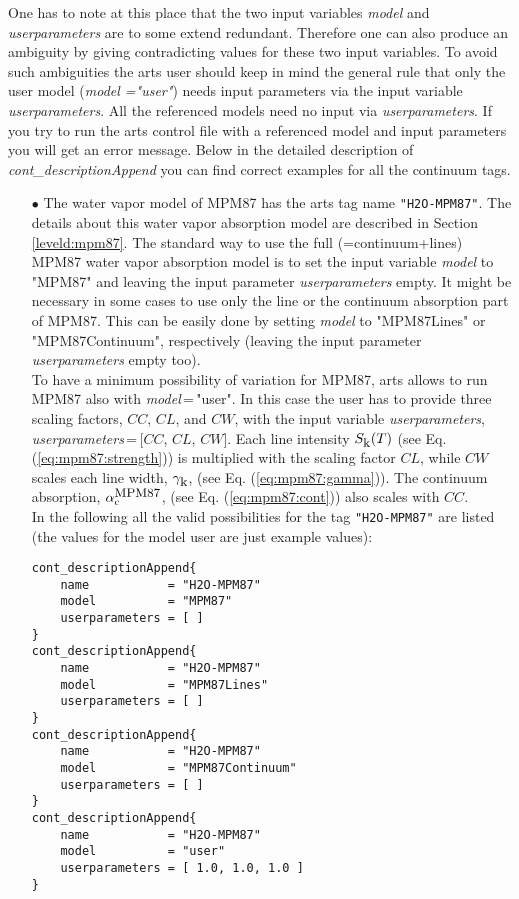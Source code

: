 One has to note at this place that the two input variables {\it model} and
{\it userparameters} are to some extend redundant. Therefore one can also 
produce an ambiguity by giving contradicting values for these two input variables.
To avoid such ambiguities the arts user should keep in mind the general 
rule that only the user model ({\it model ="user"}) needs input parameters 
via the input variable {\it userparameters}. All the referenced models 
need no input via {\it userparameters}. If you try to run the arts control 
file with a referenced model and input parameters you will get an error message.
Below in the detailed description of {\it cont\_descriptionAppend} you 
can find correct examples for all the continuum tags.

\begin{itemize}
\item[$\bullet$] The water vapor model of MPM87 \citep{liebeandlayton:87} 
     has the arts tag name {\tt "H2O-MPM87"}. The details about this water 
     vapor absorption model are described in Section \ref{leveld:mpm87}. 
     The standard way to use the full (=continuum+lines) MPM87 water 
     vapor absorption model is to set the input variable {\it model} 
     to "MPM87" and leaving the input parameter {\it userparameters} empty. 
     It might be necessary in some cases to use only the line or the 
     continuum absorption part of MPM87. This can be easily done 
     by setting {\it model} to "MPM87Lines" or "MPM87Continuum", 
     respectively (leaving the input parameter {\it userparameters} 
     empty too).\\ To have a minimum possibility of variation for MPM87, 
     arts allows to run MPM87 also with {\it model}\,=\,"user". 
     In this case the user has to provide three scaling factors,  
     $CC$, $CL$, and $CW$, with the input variable {\it userparameters}, 
     {\it userparameters}\,=\,$[$$CC$, $CL$, $CW$$]$. 
     Each line intensity $S_{\mbox{\rm \small k}}(T)$ (see Eq. (\ref{eq:mpm87:strength})) 
     is multiplied with the scaling factor $CL$, while $CW$ scales 
     each line width, $\gamma_{\mbox{\rm \small k}}$, (see Eq. (\ref{eq:mpm87:gamma})). 
     The continuum absorption, $\alpha^{\mbox{\rm \small MPM87}}_{\rm c}$, 
     (see Eq. (\ref{eq:mpm87:cont})) also scales with $CC$.\\
     In the following all the valid possibilities for the
     tag {\tt "H2O-MPM87"} are listed (the values for the 
     model user are just example values): 
\begin{lstlisting}
cont_descriptionAppend{
    name           = "H2O-MPM87"
    model          = "MPM87"
    userparameters = [ ]
}
cont_descriptionAppend{
    name           = "H2O-MPM87"
    model          = "MPM87Lines"
    userparameters = [ ]
}
cont_descriptionAppend{
    name           = "H2O-MPM87"
    model          = "MPM87Continuum"
    userparameters = [ ]
}
cont_descriptionAppend{
    name           = "H2O-MPM87"
    model          = "user"
    userparameters = [ 1.0, 1.0, 1.0 ]
}
\end{lstlisting}


\end{itemize}

